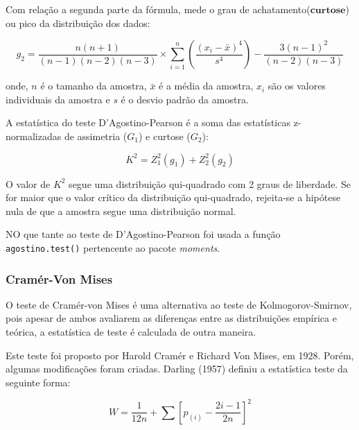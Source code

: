 \documentclass[a4paper,11pt]{article} %
\begin{document}
Com relação a segunda parte da fórmula, mede o grau de achatamento($\textbf{curtose}$) ou pico da distribuição dos dados:

\begin{equation}
g_{2} = \frac{n(n+1)}{(n-1)(n-2)(n-3)} \times \sum_{i=1}^{n} \left(  \frac{(x_{i}-\bar{x})^{4}}{s^{4}} \right) - \frac{3(n-1)^{2}}{(n-2)(n-3)}
\end{equation}

onde, $n$ é o tamanho da amostra, $\bar{x}$ é a média da amostra, $x_{i}$ são os valores individuais da amostra e $s$ é o desvio padrão da amostra.

\vspace{0.5cm}

A estatística do teste  D'Agostino-Pearson é a soma das estatísticas z-normalizadas de assimetria ($G_{1}$) e curtose ($G_{2}$):

\begin{equation}
    K^{2} = Z_{1}^{2}(g_{1}) + Z_{2}^{2}(g_{2})
\end{equation}

O valor de $K^{2}$ segue uma distribuição qui-quadrado com 2 graus de liberdade. Se for maior que o valor crítico da distribuição qui-quadrado, rejeita-se a hipótese nula de que a amostra segue uma distribuição normal.

\vspace{0.5cm}

NO que tante ao teste de D’Agostino-Pearson foi usada a função \texttt{agostino.test()} pertencente ao pacote \textit{moments}.\vskip0.3cm


\subsubsection{Cramér-Von Mises}

O teste de Cramér-von Mises é uma alternativa ao teste de Kolmogorov-Smirnov, pois apesar de ambos avaliarem as diferenças entre as distribuições empírica e teórica, a estatística de teste é calculada de outra maneira.

\vspace{0.5cm}

Este teste foi proposto por Harold Cramér e Richard Von Mises, em 1928. Porém, algumas modificações foram criadas. Darling (1957) definiu a estatística teste da seguinte forma:

\begin{equation}
    W = \frac{1}{12n} + \sum \left[ p_{(i)} - \frac{2i-1}{2n} \right]^{2}
\end{equation}
\end{document}
